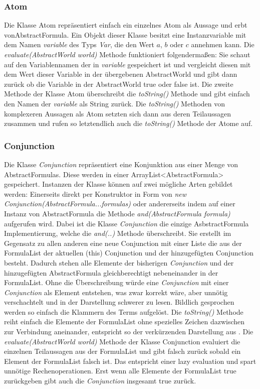\documentclass[12pt,a4paper]{article}
\begin{document}
\subsubsection{Atom}


Die Klasse Atom repräsentiert einfach ein einzelnes Atom als Aussage und erbt vonAbstractFormula. Ein Objekt dieser Klasse besitzt eine Instanzvariable mit dem Namen \textit{variable} des Typs \textit{Var}, die den Wert $a$, $b$ oder $c$ annehmen kann. Die \textit{evaluate(AbstractWorld world)} Methode funktioniert folgendermaßen: Sie schaut auf den Variablennamen der in \textit{variable} gespeichert ist und vergleicht diesen mit dem Wert dieser Variable in der übergebenen AbstractWorld und gibt dann zurück ob die Variable in der AbstractWorld true oder false ist. Die zweite Methode der Klasse Atom überschreibt die \textit{toString()} Methode und gibt einfach den Namen der \textit{variable} als String zurück. Die \textit{toString()} Methoden von komplexeren Aussagen als Atom setzten sich dann aus deren Teilaussagen zusammen und rufen so letztendlich auch die \textit{toString()} Methode der Atome auf.


\subsubsection{Conjunction}
Die Klasse \textit{Conjunction} repräsentiert eine Konjunktion aus einer Menge von AbstractFormulas. Diese werden in einer ArrayList<AbstractFormula> gespeichert. Instanzen der Klasse können auf zwei mögliche Arten gebildet werden: Einerseits direkt per Konstruktor in Form von \textit{new Conjunction(AbstractFormula...formulas)} oder andererseits indem auf einer Instanz von AbstractFormula die Methode \textit{and(AbstractFormula formula)} aufgerufen wird. Dabei ist die Klasse \textit{Conjunction} die einzige AsbstractFormula Implementierung, welche die \textit{and(..)} Methode überschreibt. Sie erstellt im Gegensatz zu allen anderen eine neue Conjunction mit einer Liste die aus der FormulaList der aktuellen (this) Conjunction und der hinzugefügten Conjunction besteht. Dadurch stehen alle Elemente der bisherigen \textit{Conjunction} und der hinzugefügten AbstractFormula gleichberechtigt nebeneinander in der FormulaList. Ohne die Überschreibung würde eine \textit{Conjunction} mit einer \textit{Conjunction} als Element entstehen, was zwar korrekt wäre, aber unnötig verschachtelt und in der Darstellung schwerer zu lesen. Bildlich gesprochen werden so einfach die Klammern des Terms aufgelöst. Die \textit{toString()} Methode reiht einfach die Elemente der FormulaList ohne spezielles Zeichen dazwischen zur Verbindung aneinander, entspricht so der verkürzenden Darstellung aus \cite{beierle19}. Die \textit{evaluate(AbstractWorld world)} Methode der Klasse Conjunction evaluiert die einzelnen Teilaussagen aus der FormulaList und gibt falsch zurück sobald ein Element der FormulaList falsch ist. Das entspricht einer lazy evaluation und spart unnötige Rechenoperationen. Erst wenn alle Elemente der FormulaList true zurückgeben gibt auch die \textit{Conjunction} insgesamt true zurück.
\end{document}
